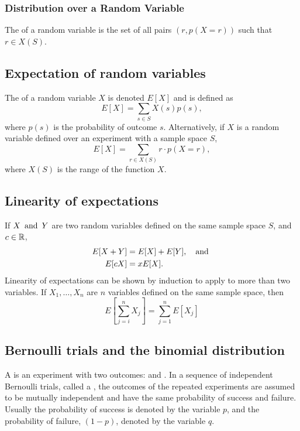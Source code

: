 \subsubsection*{Distribution over a Random Variable}
The  of a random variable is the set of all pairs $(r,p(X=r))$ such that $r \in X(S)$.

\subsection{Expectation of random variables}
The  of a random variable $X$ is denoted $E[X]$ and is defined as
\[
  E[X] = \sum_{s \in S} X(s)p(s),
\]
where $p(s)$ is the probability of outcome $s$. Alternatively, if $X$ is a random variable defined over an experiment with a sample space $S$,
\[
  E[X] = \sum_{r \in X(S)} r \cdot p(X = r),
\]
where $X(S)$ is the range of the function $X$.

\subsection{Linearity of expectations}
If $X \operatorname{~\text{and}~} Y$ are two random variables defined on the same sample space $S$, and $c \in \mathbb{R}$,
\begin{align*}
  E[X+Y] & = E[X] + E[Y],~~\operatorname{~\text{and}~} \\
  E[cX]  & = xE[X].
\end{align*}
Linearity of expectations can be shown by induction to apply to more than two variables. If $X_1,\ldots,X_n$ are $n$ variables defined on the same sample space, then
\[
  E\left[\sum_{j=i}^{n} X_j\right] = \sum_{j=1}^{n} E[X_j]
\]

\subsection{Bernoulli trials and the binomial distribution}
A  is an experiment with two outcomes:  and . In a sequence of independent Bernoulli trials, called a , the outcomes of the repeated experiments are assumed to be mutually independent and have the same probability of success and failure. Usually the probability of success is denoted by the variable $p$, and the probability of failure, $(1-p)$, denoted by the variable $q$.

